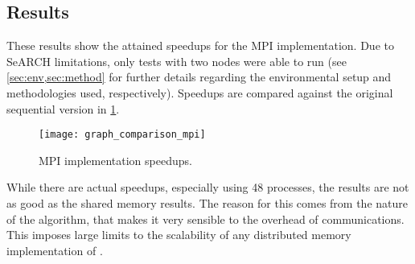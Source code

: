 \subsection{Results}
\label{sec:mpi:results}

These results show the attained speedups for the MPI implementation.
Due to SeARCH limitations, only tests with two nodes were able to run (see \cref{sec:env,sec:method} for further details regarding the environmental setup and methodologies used, respectively).
Speedups are compared against the original sequential version in \cref{fig:mpi:results}.

\begin{figure}[!htp]
	\centering
	\texttt{[image: graph\_comparison\_mpi]}
	\caption{MPI implementation speedups.}
	\label{fig:mpi:results}
\end{figure}

While there are actual speedups, especially using 48 processes, the results are not as good as the shared memory results.
The reason for this comes from the nature of the algorithm, that makes it very sensible to the overhead of communications.
This imposes large limits to the scalability of any distributed memory implementation of \polu.

